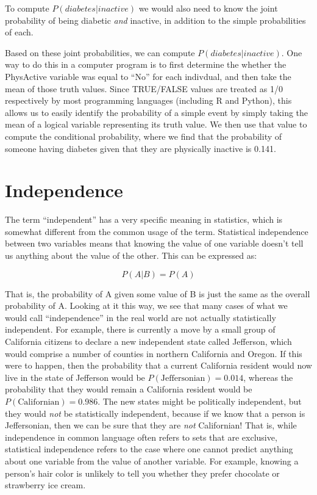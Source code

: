 \documentclass[12pt,]{book}
\theoremstyle{definition}
\theoremstyle{definition}
\theoremstyle{definition}
\theoremstyle{remark}
\begin{document}
To compute \(P(diabetes|inactive)\) we would also need to know the joint probability of being diabetic \emph{and} inactive, in addition to the simple probabilities of each.

Based on these joint probabilities, we can compute \(P(diabetes|inactive)\). One way to do this in a computer program is to first determine the whether the PhysActive variable was equal to ``No'' for each indivdual, and then take the mean of those truth values. Since TRUE/FALSE values are treated as 1/0 respectively by most programming languages (including R and Python), this allows us to easily identify the probability of a simple event by simply taking the mean of a logical variable representing its truth value. We then use that value to compute the conditional probability, where we find that the probability of someone having diabetes given that they are physically inactive is 0.141.

\hypertarget{independence}{%
\section{Independence}\label{independence}}

The term ``independent'' has a very specific meaning in statistics, which is somewhat different from the common usage of the term. Statistical independence between two variables means that knowing the value of one variable doesn't tell us anything about the value of the other. This can be expressed as:

\[
P(A|B) = P(A)
\]

That is, the probability of A given some value of B is just the same as the overall probability of A. Looking at it this way, we see that many cases of what we would call ``independence'' in the real world are not actually statistically independent. For example, there is currently a move by a small group of California citizens to declare a new independent state called Jefferson, which would comprise a number of counties in northern California and Oregon. If this were to happen, then the probability that a current California resident would now live in the state of Jefferson would be \(P(\text{Jeffersonian})=0.014\), whereas the probability that they would remain a California resident would be \(P(\text{Californian})=0.986\). The new states might be politically independent, but they would \emph{not} be statistically independent, because if we know that a person is Jeffersonian, then we can be sure that they are \emph{not} Californian! That is, while independence in common language often refers to sets that are exclusive, statistical independence refers to the case where one cannot predict anything about one variable from the value of another variable. For example, knowing a person's hair color is unlikely to tell you whether they prefer chocolate or strawberry ice cream.
\end{document}
